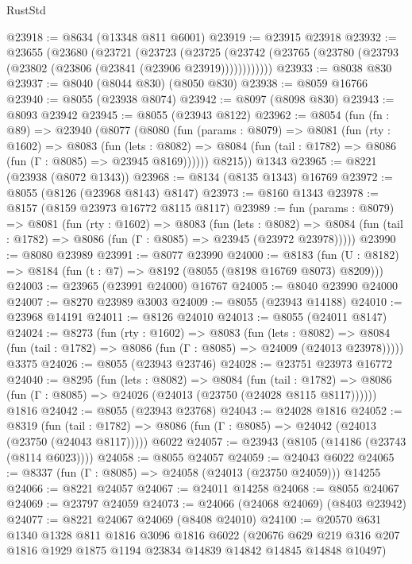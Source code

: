 \begin{lexlean}{RustStd}
\begin{coremodule}
@23918 := @8634 (@13348 @811 @6001)
@23919 := @23915 @23918
@23932 := @23655
    (@23680
      (@23721
        (@23723
          (@23725 (@23742 (@23765 (@23780 (@23793 (@23802 (@23806 (@23841 (@23906 @23919))))))))))))
@23933 := @8038 @830
@23937 := @8040 (@8044 @830) (@8050 @830)
@23938 := @8059 @16766
@23940 := @8055 (@23938 @8074)
@23942 := @8097 (@8098 @830)
@23943 := @8093 @23942
@23945 := @8055 (@23943 @8122)
@23962 := @8054
    (fun (fn : @89) =>
    @23940
      (@8077
        (@8080
          (fun (params : @8079) =>
          @8081
            (fun (rty : @1602) =>
            @8083
              (fun (lets : @8082) =>
              @8084 (fun (tail : @1782) => @8086 (fun (Γ : @8085) => @23945 @8169))))))
        @8215))
    @1343
@23965 := @8221 (@23938 (@8072 @1343))
@23968 := @8134 (@8135 @1343) @16769
@23972 := @8055 (@8126 (@23968 @8143) @8147)
@23973 := @8160 @1343
@23978 := @8157 (@8159 @23973 @16772 @8115 @8117)
@23989 := fun (params : @8079) =>
  @8081
    (fun (rty : @1602) =>
    @8083
      (fun (lets : @8082) =>
      @8084 (fun (tail : @1782) => @8086 (fun (Γ : @8085) => @23945 (@23972 @23978)))))
@23990 := @8080 @23989
@23991 := @8077 @23990
@24000 := @8183
    (fun (U : @8182) => @8184 (fun (t : @7) => @8192 (@8055 (@8198 @16769 @8073) @8209)))
@24003 := @23965 (@23991 @24000) @16767
@24005 := @8040 @23990 @24000
@24007 := @8270 @23989 @3003
@24009 := @8055 (@23943 @14188)
@24010 := @23968 @14191
@24011 := @8126 @24010
@24013 := @8055 (@24011 @8147)
@24024 := @8273
    (fun (rty : @1602) =>
    @8083
      (fun (lets : @8082) =>
      @8084 (fun (tail : @1782) => @8086 (fun (Γ : @8085) => @24009 (@24013 @23978)))))
    @3375
@24026 := @8055 (@23943 @23746)
@24028 := @23751 @23973 @16772
@24040 := @8295
    (fun (lets : @8082) =>
    @8084
      (fun (tail : @1782) =>
      @8086 (fun (Γ : @8085) => @24026 (@24013 (@23750 (@24028 @8115 @8117))))))
    @1816
@24042 := @8055 (@23943 @23768)
@24043 := @24028 @1816
@24052 := @8319
    (fun (tail : @1782) => @8086 (fun (Γ : @8085) => @24042 (@24013 (@23750 (@24043 @8117)))))
    @6022
@24057 := @23943 (@8105 (@14186 (@23743 (@8114 @6023))))
@24058 := @8055 @24057
@24059 := @24043 @6022
@24065 := @8337 (fun (Γ : @8085) => @24058 (@24013 (@23750 @24059))) @14255
@24066 := @8221 @24057
@24067 := @24011 @14258
@24068 := @8055 @24067
@24069 := @23797 @24059
@24073 := @24066 (@24068 @24069) (@8403 @23942)
@24077 := @8221 @24067 @24069 (@8408 @24010)
@24100 := @20570
    @631
    @1340
    @1328
    @811
    @1816
    @3096
    @1816
    @6022
    (@20676 @629 @219 @316 @207 @1816 @1929 @1875 @1194 @23834 @14839 @14842 @14845 @14848 @10497)

\end{coremodule}
\end{lexlean}
